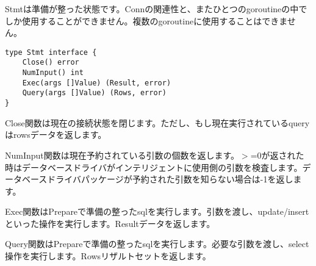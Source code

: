 Stmtは準備が整った状態です。Connの関連性と、またひとつのgoroutineの中でしか使用することができません。複数のgoroutineに使用することはできません。

\begin{lstlisting}[numbers=none]
type Stmt interface {
    Close() error
    NumInput() int
    Exec(args []Value) (Result, error)
    Query(args []Value) (Rows, error)
}
\end{lstlisting}

Close関数は現在の接続状態を閉じます。ただし、もし現在実行されているqueryはrowsデータを返します。

NumInput関数は現在予約されている引数の個数を返します。$>$=0が返された時はデータベースドライバがインテリジェントに使用側の引数を検査します。データベースドライバパッケージが予約された引数を知らない場合は-1を返します。

Exec関数はPrepareで準備の整ったsqlを実行します。引数を渡し、update/insertといった操作を実行します。Resultデータを返します。

Query関数はPrepareで準備の整ったsqlを実行します。必要な引数を渡し、select操作を実行します。Rowsリザルトセットを返します。

